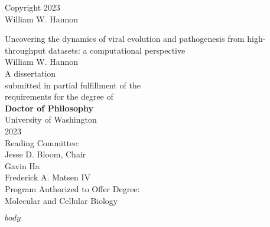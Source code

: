 \documentclass[12pt,oneside,letterpaper]{report}
\begin{document}
\thispagestyle{empty}
\begin{center}
\textcopyright{} Copyright 2023 \\
William W. Hannon
\end{center}
\vspace*{\fill}
\newpage

\begin{singlespace}
\thispagestyle{empty}
\begin{center}
\huge{Uncovering the dynamics of viral evolution and pathogenesis from high-throughput datasets: a computational perspective} \\
\vspace{2cm}
\Large{William W. Hannon} \\
\vspace{2cm}
A dissertation \\
submitted in partial fulfillment of the \\
requirements for the degree of \\
\vspace{1cm}
\textbf{Doctor of Philosophy} \\
\vspace{1cm}
University of Washington \\
2023 \\
\vspace{1cm}
Reading Committee: \\
Jesse D. Bloom, Chair \\
Gavin Ha \\
Frederick A. Matsen IV \\
\vspace{1cm}
Program Authorized to Offer Degree: \\
Molecular and Cellular Biology
\end{center}
\end{singlespace}
\newpage


\newpage

\tableofcontents
\newpage



\newpage

$body$
\newpage



\end{document}
